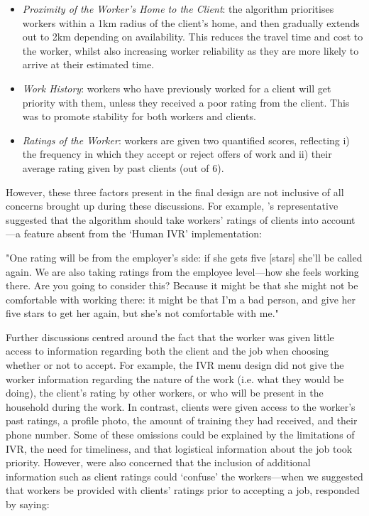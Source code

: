 \begin{itemize}
  \item \textit{Proximity of the Worker's Home to the Client}: the algorithm prioritises workers within a 1km radius of the client’s home, and then gradually extends out to 2km depending on availability. This reduces the travel time and cost to the worker, whilst also increasing worker reliability as they are more likely to arrive at their estimated time. 
  \item \textit{Work History}: workers who have previously worked for a client will get priority with them, unless they received a poor rating from the client. This was to promote stability for both workers and clients.
  \item \textit{Ratings of the Worker}: workers are given two quantified scores, reflecting i) the frequency in which they accept or reject offers of work and ii) their average rating given by past clients (out of 6).
\end{itemize}

However, these three factors present in the final design are not inclusive of all concerns brought up during these discussions. For example, \NGO{}'s representative suggested that the algorithm should take workers' ratings of clients into account---a feature absent from the `Human IVR' implementation:

\begin{displayquote}
"One rating will be from the employer’s side: if she gets five [stars] she’ll be called again. We are also taking ratings from the employee level---how she feels working there. Are you going to consider this? Because it might be that she might not be comfortable with working there: it might be that I’m a bad person, and give her five stars to get her again, but she’s not comfortable with me."
\end{displayquote}

Further discussions centred around the fact that the worker was given little access to information regarding both the client and the job when choosing whether or not to accept. For example, the IVR menu design did not give the worker information regarding the nature of the work (i.e. what they would be doing), the client's rating by other workers, or who will be present in the household during the work. In contrast, clients were given access to the worker's past ratings, a profile photo, the amount of training they had received, and their phone number. Some of these omissions could be explained by the limitations of IVR, the need for timeliness, and that logistical information about the job took priority. However, \PC{} were also concerned that the inclusion of additional information such as client ratings could `confuse' the workers---when we suggested that workers be provided with clients' ratings prior to accepting a job, \PC{} responded by saying:

